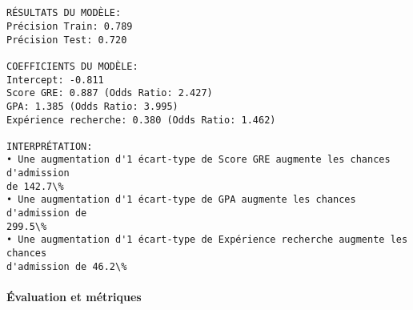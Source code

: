 \documentclass[11pt]{article}
\begin{document}
    \begin{center}
    \end{center}
    { \hspace*{\fill} \\}
    
    \begin{Verbatim}[commandchars=\\\{\}]

RÉSULTATS DU MODÈLE:
Précision Train: 0.789
Précision Test: 0.720

COEFFICIENTS DU MODÈLE:
Intercept: -0.811
Score GRE: 0.887 (Odds Ratio: 2.427)
GPA: 1.385 (Odds Ratio: 3.995)
Expérience recherche: 0.380 (Odds Ratio: 1.462)

INTERPRÉTATION:
• Une augmentation d'1 écart-type de Score GRE augmente les chances d'admission
de 142.7\%
• Une augmentation d'1 écart-type de GPA augmente les chances d'admission de
299.5\%
• Une augmentation d'1 écart-type de Expérience recherche augmente les chances
d'admission de 46.2\%
    \end{Verbatim}

    \paragraph{Évaluation et métriques}\label{uxe9valuation-et-muxe9triques}
\end{document}
